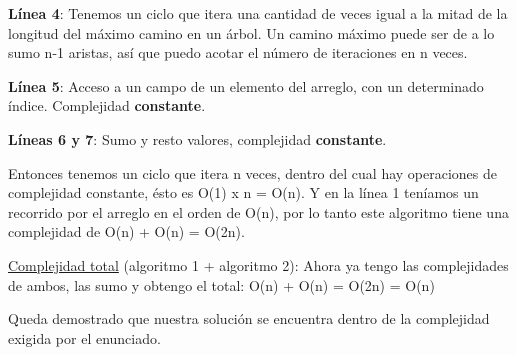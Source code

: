 \textbf{Línea 4}: Tenemos un ciclo que itera una cantidad de veces igual a la mitad de la longitud del máximo camino en un árbol. Un camino máximo puede ser de a lo sumo n-1 aristas, así que puedo acotar el número de iteraciones en n veces.

\textbf{Línea 5}: Acceso a un campo de un elemento del arreglo, con un determinado índice. Complejidad \textbf{constante}.

\textbf{Líneas 6 y 7}: Sumo y resto valores, complejidad \textbf{constante}.

Entonces tenemos un ciclo que itera n veces, dentro del cual hay operaciones de complejidad constante, ésto es O(1) x n = O(n). Y en la línea 1 teníamos un recorrido por el arreglo en el orden de O(n), por lo tanto este algoritmo tiene una complejidad de O(n) + O(n) = O(2n).

\underline{Complejidad total} (algoritmo 1 + algoritmo 2):
Ahora ya tengo las complejidades de ambos, las sumo y obtengo el total:
O(n) + O(n) = O(2n) = O(n)

Queda demostrado que nuestra solución se encuentra dentro de la complejidad exigida por el enunciado.  